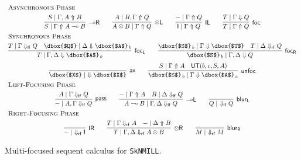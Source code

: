 \documentclass[runningheads]{llncs}
\newcommand{\tl}{\otimes \mathsf{L}}
\newcommand{\tr}{\otimes \mathsf{R}}
\newcommand{\lright}{{\multimap}\mathsf{R}}
\newcommand{\lleft}{{\multimap}\mathsf{L}}
\newcommand{\pass}{\mathsf{pass}}
\newcommand{\unitl}{\mathsf{IL}}
\newcommand{\unitr}{\mathsf{IR}}
\newcommand{\otL}{\tl}
\newcommand{\otR}{\tr}
\newcommand{\lolliR}{\lright}
\newcommand{\lolliL}{\lleft}
\newcommand{\IL}{\unitl}
\newcommand{\IR}{\unitr}
\newcommand{\ax}{\mathsf{ax}}
\newcommand{\ot}{\otimes}
\newcommand{\lolli}{\multimap}
\newcommand{\I}{\mathsf{I}}
\newcommand{\lf}{\dn_\mathsf{lf}}%
\newcommand{\rf}{\dn_\mathsf{rf}}%
\newcommand{\SkNMILL}{\texttt{SkNMILL}}
\newcommand{\UT}{\mathsf{UT}}
\newcommand{\up}{\Uparrow}
\newcommand{\dn}{\Downarrow}
\newcommand{\focL}{\mathsf{foc_L}}
\newcommand{\foc}{\mathsf{foc}}
\newcommand{\focR}{\mathsf{foc_R}}
\newcommand{\blurL}{\mathsf{blur_L}}
\newcommand{\blurR}{\mathsf{blur_R}}
\newcommand{\unfoc}{\mathsf{unfoc}}
\begin{document}
\begin{figure}[t]
  \[
  \begin{array}{c}
    \multicolumn{1}{l}{\text{\textsc{Asynchronous Phase}}} \\[4pt]
      \infer[\lolliR]{S \mid \Gamma \up A \lolli B}{S \mid \Gamma , A \up B}
    \qquad
    \infer[\otL]{A \ot B \mid \Gamma \up Q}{A \mid  B , \Gamma \up Q}
    \qquad
      \infer[\IL]{\I \mid \Gamma \up Q}{- \mid \Gamma \up Q}    
    \qquad
        \infer[\foc]{T \mid \Gamma \up Q}{
      T \mid \Gamma \dn Q
    }
    \\[4pt]
    \multicolumn{1}{l}{\text{\textsc{Synchronous Phase}}} \\[4pt]
        \infer[\focL]{T \mid \Gamma , \Delta \dn \dbox{$A$}_{\, b}}{
          T \mid \Gamma \lf Q &
          \dbox{$Q$} \mid \Delta \dn \dbox{$A$}_{\, b}
        }
    \qquad
    \infer[\focR]{\dbox{$S$}_{\, b} \mid \Gamma,\Delta \dn Q}{
      \dbox{$S$}_{\, b} \mid \Gamma \dn \dbox{$T$}
      &
      T \mid \Delta \rf Q
    }
    \\[6pt]
        \infer[\ax]{\dbox{$X$} \mid ~ \dn \dbox{$X$}}{}
    \qquad
    \infer[\unfoc]{\dbox{$S$}_{\,b} \mid \Gamma \dn \dbox{$A$}_{\,c}}{
      S \mid \Gamma \up A
      &
      \UT(b,c,S,A)
    }
    \\[4pt]
    \multicolumn{1}{l}{\text{\textsc{Left-Focusing Phase}}} \\[4pt]
    \infer[\pass]{- \mid A , \Gamma \lf Q}{
      A \mid \Gamma \lf Q
    }
    \qquad
    \infer[\lolliL]{A \lolli B \mid \Gamma , \Delta \lf Q}{
      - \mid \Gamma \up A
      &
      B \mid  \Delta \lf Q
    }
    \qquad
        \infer[\blurL]{Q \mid ~ \lf Q}{
      }    
    \\[4pt]
    \multicolumn{1}{l}{\text{\textsc{Right-Focusing Phase}}} \\[4pt]
    \infer[\IR]{- \mid ~ \rf \I}{}
    \qquad
    \infer[\otR]{T \mid \Gamma , \Delta \rf A \ot B}{
      T \mid \Gamma \rf A
      &
      - \mid \Delta \up B
    }
    \qquad
        \infer[\blurR]{M \mid ~ \rf M}{}
    \end{array}
  \]
  \caption{Multi-focused sequent calculus for \SkNMILL.} 
  \label{fig:multi-focus}
\end{figure}
\end{document}
